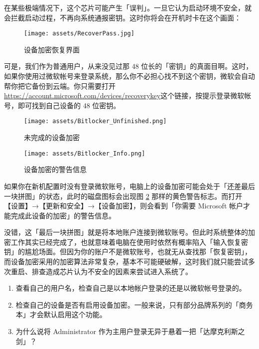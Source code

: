 在某些极端情况下，这个芯片可能产生「误判」。一旦它认为启动环境不安全，就会拦截启动过程，不再向系统通报密钥。这时你将会在开机时卡在这个画面：

\begin{figure}[htb!]
  \centering
  \texttt{[image: assets/RecoverPass.jpg]}
  \caption{设备加密恢复界面}
  \label{recover-pass}
\end{figure}

可是，我们作为普通用户，从来没见过那 48 位长的「密钥」的真面目啊。这时，如果你使用过微软帐号来登录系统，那么你不必担心找不到这个密钥，微软会自动帮你把它备份到云端。你只需要打开\url{https://account.microsoft.com/devices/recoverykey}这个链接，按提示登录微软帐号，即可找到自己设备的 48 位密钥。

\begin{figure}[htb!]
  \centering
  \texttt{[image: assets/Bitlocker\_Unfinished.png]}
  \caption{未完成的设备加密}
  \label{Bitlocker_Unfinished}
\end{figure}

\begin{figure}[htb!]
  \centering
  \texttt{[image: assets/Bitlocker\_Info.png]}
  \caption{设备加密的警告信息}
  \label{Bitlocker_Info}
\end{figure}

如果你在新机配置时没有登录微软账号，电脑上的设备加密可能会处于「还差最后一块拼图」的状态，此时的磁盘图标会出现图 \ref{Bitlocker_Unfinished} 那样的黄色警告标志。而打开【设置】→【更新和安全】→【设备加密】，则会看到「你需要 Microsoft 帐户才能完成此设备的加密」的警告信息。

没错，这「最后一块拼图」就是将本地账户连接到微软账号。但此时系统整体的加密工作其实已经完成了，也就意味着电脑在使用时依然有概率陷入「输入恢复密钥」的尴尬场面。但因为你的账户不是微软账号，也就无从查找那「恢复密钥」，而设备加密采用的加密算法非常复杂，基本不可能硬破解，这时我们就只能尝试多次重启、排查造成芯片认为不安全的因素来尝试进入系统了。


\practice

\begin{enumerate}
  \item 查看自己的用户名，检查自己是以本地帐户登录的还是以微软帐号登录的。
  \item 检查自己的设备是否有启用设备加密。一般来说，只有部分品牌系列的「商务本」才会默认启用这个功能。
  \item 为什么说将 Administrator 作为主用户登录无异于悬着一把「达摩克利斯之剑」？
\end{enumerate}